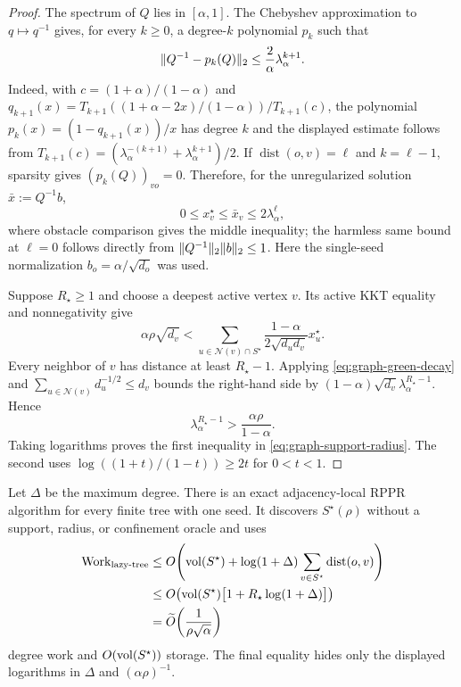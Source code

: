 \begin{proof}
The spectrum of $Q$ lies in $[\alpha,1]$.  The Chebyshev approximation to
$q\mapsto q^{-1}$ gives, for every $k\geq0$, a degree-$k$ polynomial $p_k$
such that
\begin{equation}
 \lVert Q^{-1}-p_k(Q)\rVert_2
 \leq\frac{2}{\alpha}\lambda_\alpha^{k+1}.
 \label{eq:chebyshev-inverse-error}
\end{equation}
Indeed, with
$c=(1+\alpha)/(1-\alpha)$ and
$q_{k+1}(x)=
T_{k+1}((1+\alpha-2x)/(1-\alpha))/T_{k+1}(c)$, the polynomial
$p_k(x)=(1-q_{k+1}(x))/x$ has degree $k$ and the displayed estimate follows
from
$T_{k+1}(c)=(\lambda_\alpha^{-(k+1)}+
\lambda_\alpha^{k+1})/2$.
If $\operatorname{dist}(o,v)=\ell$ and $k=\ell-1$, sparsity gives
$(p_k(Q))_{vo}=0$.  Therefore, for the unregularized solution
$\bar x:=Q^{-1}b$,
\begin{equation}
 0\leq x_v^\star\leq\bar x_v
 \leq 2\lambda_\alpha^\ell,
 \label{eq:graph-green-decay}
\end{equation}
where obstacle comparison gives the middle inequality; the harmless same
bound at $\ell=0$ follows directly from
$\lVert Q^{-1}\rVert_2\lVert b\rVert_2\leq1$.  Here the single-seed normalization
$b_o=\alpha/\sqrt{d_o}$ was used.

Suppose $R_\star\geq1$ and choose a deepest active vertex $v$.  Its active
KKT equality and nonnegativity give
\begin{equation}
 \alpha\rho\sqrt{d_v}
 <\sum_{u\in\mathcal N(v)\cap S^\star}
   \frac{1-\alpha}{2\sqrt{d_ud_v}}x_u^\star.
 \label{eq:deepest-active-demand}
\end{equation}
Every neighbor of $v$ has distance at least $R_\star-1$.  Applying
\cref{eq:graph-green-decay} and
$\sum_{u\in\mathcal N(v)}d_u^{-1/2}\leq d_v$ bounds the right-hand side by
$(1-\alpha)\sqrt{d_v}\lambda_\alpha^{R_\star-1}$.  Hence
\begin{equation*}
 \lambda_\alpha^{R_\star-1}
 >\frac{\alpha\rho}{1-\alpha}.
\end{equation*}
Taking logarithms proves the first inequality in
\cref{eq:graph-support-radius}.  The second uses
$\log((1+t)/(1-t))\geq2t$ for $0<t<1$.
\end{proof}

\begin{theorem}
\label{thm:lazy-tree-response}
Let $\Delta$ be the maximum degree.  There is an exact adjacency-local RPPR
algorithm for every finite tree with one seed.  It discovers
$S^\star(\rho)$ without a support, radius, or confinement oracle and uses
\begin{align}
 \operatorname{Work}_{\rm lazy\text{-}tree}
 &\leq
 O\!\left(
  \operatorname{vol}(S^\star)
  +\log(1+\Delta)
    \sum_{v\in S^\star}\operatorname{dist}(o,v)
 \right)\notag\\
 &\leq
 O\!\left(
  \operatorname{vol}(S^\star)\bigl[1+R_\star\log(1+\Delta)\bigr]
 \right)\notag\\
 &=\widetilde O\!\left(\frac1{\rho\sqrt\alpha}\right)
 \label{eq:lazy-tree-response-work}
\end{align}
degree work and $O(\operatorname{vol}(S^\star))$ storage.  The final equality hides only
the displayed logarithms in $\Delta$ and $(\alpha\rho)^{-1}$.
\end{theorem}


